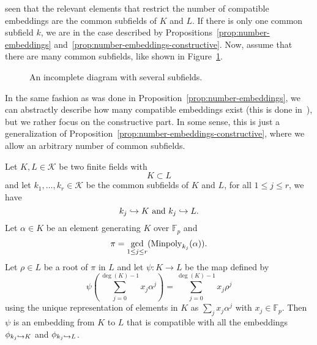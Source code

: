 seen that the relevant elements that restrict the number of compatible
embeddings are the common subfields of $K$ and $L$. If there is only one common
subfield $k$, we are in the case described by
Propositions~\ref{prop:number-embeddings}
and~\ref{prop:number-embeddings-constructive}. Now, assume that there are many
common subfields, like shown in Figure~\ref{fig:incomplete-sev}.%
\begin{figure}
  \centering
  \caption{An incomplete diagram with several subfields.}
  \label{fig:incomplete-sev}
\end{figure}
In the same fashion as was done in Proposition~\ref{prop:number-embeddings}, we
can abstractly describe how many compatible embeddings exist (this is done
in~\cite[Section 2.5]{BCS97}), but we rather focus on the constructive part. In
some sense, this is just a generalization of
Proposition~\ref{prop:number-embeddings-constructive}, where we allow an
arbitrary number of common subfields.
\begin{prop}
  \label{prop:several-subfields}
  Let $K, L\in\mathcal K$ be two finite fields with
  \[
    K\subset L
  \]
  and let $k_1, \dots, k_r\in\mathcal K$ be the common subfields of $K$ and $L$,
  \ie for all $1\leq j\leq r$, we have
  \[
    k_j\hookrightarrow K\text{ and }k_j\hookrightarrow L.
  \]
  Let $\alpha\in K$ be an element generating $K$ over $\mathbb{F}_p$ and
  \[
    \pi = \gcd_{1\leq j\leq r}(\operatorname{Minpoly}_{k_j}(\alpha)).
  \]
  Let $\rho\in L$ be a root of $\pi$ in $L$ and let $\psi:K\to L$ be the map
  defined by
  \[
    \psi\left(\sum_{j=0}^{\deg(K)-1}x_j\alpha^j\right) =
    \sum_{j=0}^{\deg(K)-1}x_j\rho^j
  \]
  using the unique representation of elements in $K$ as $\sum_j x_j\alpha^j$
  with $x_j\in\mathbb{F}_p$. Then $\psi$ is an embedding from $K$ to $L$ that is
  compatible with all the embeddings $\phi_{k_j\hookrightarrow K}$ and $\phi_{k_j\hookrightarrow L}$.
\end{prop}
